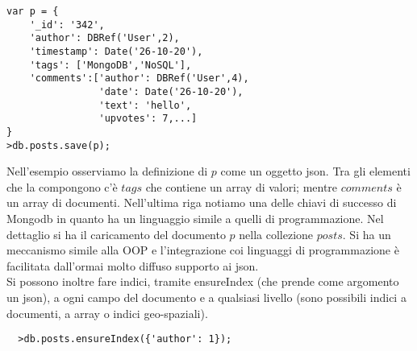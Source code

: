 \begin{lstlisting}
var p = {
    '_id': '342',
    'author': DBRef('User',2),
    'timestamp': Date('26-10-20'),
    'tags': ['MongoDB','NoSQL'],
    'comments':['author': DBRef('User',4),
                'date': Date('26-10-20'),
                'text': 'hello',
                'upvotes': 7,...]
}
>db.posts.save(p);            
\end{lstlisting}
Nell'esempio osserviamo la definizione di $p$ come un oggetto json. Tra gli elementi che la compongono c’è $tags$ che contiene un array di valori; mentre $comments$ è un array di documenti.
Nell’ultima riga notiamo una delle chiavi di successo di Mongodb in quanto ha un linguaggio simile a quelli di programmazione. Nel dettaglio si ha il caricamento del documento $p$ nella collezione $posts$. Si ha un meccanismo simile alla OOP e l’integrazione coi linguaggi di programmazione è facilitata dall’ormai molto diffuso supporto ai json.\\
Si possono inoltre fare indici, tramite ensureIndex (che prende come argomento un json), a ogni campo del documento e a qualsiasi livello (sono possibili indici a documenti, a array o indici geo-spaziali).
\begin{lstlisting}
  >db.posts.ensureIndex({'author': 1});      
\end{lstlisting}


